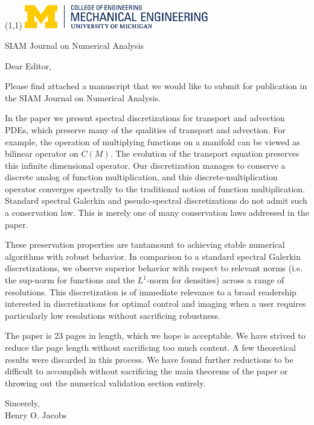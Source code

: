\documentclass{letter}
\begin{document}
\begin{textblock}{1}(1,1)
  \includegraphics[width=80mm]{CoE-ME-horiz-PMS}
\end{textblock}
\begin{letter}{SIAM Journal on Numerical Analysis}
\opening{Dear Editor,}
Please find attached a manuscript that we would like to submit for
publication in the SIAM Journal on Numerical Analysis.

In the paper we present spectral discretizations for transport and advection PDEs, which preserve many of the qualities of transport and advection.
For example, the operation of multiplying functions on a manifold can be viewed as bilinear operator on $C(M)$.
The evolution of the transport equation preserves this infinite dimensional operator.
Our discretization manages to conserve a discrete analog of function multiplication, and this discrete-multiplication operator converges spectrally to the traditional notion of function multiplication.
Standard spectral Galerkin and pseudo-spectral discretizations do not admit such a conservation law.
This is merely one of many conservation laws addressed in the paper.

These preservation properties are tantamount to achieving stable numerical algorithms with robust behavior.
In comparison to a standard spectral Galerkin discretizations, we observe superior behavior with respect to relevant norms (i.e. the sup-norm for functions and the $L^{1}$-norm for densities) across a range of resolutions.
This discretization is of immediate relevance to a broad readership interested in discretizations for optimal control and imaging when a user requires particularly low resolutions without sacrificing robustness.

The paper is 23 pages in length, which we hope is acceptable.
We have strived to reduce the page length without sacrificing too much content.
A few theoretical results were discarded in this process.
We have found further reductions to be difficult to accomplish without sacrificing the main theorems of the paper or throwing out the numerical validation section entirely.

\closing{Sincerely,\\
Henry O. Jacobs
}

\end{letter}
\end{document}
